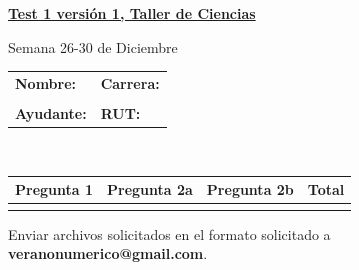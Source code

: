 \documentclass[11pt]{article}
\begin{document}
\hspace*{-1,5cm}

\vspace*{0.5cm} \centerline {\bf\underline{Test 1 versión 1, Taller de Ciencias }}
\centerline{\textrm{Semana 26-30 de Diciembre}}  \vspace{0.2cm}


\begin{center}
 \begin{tabular}{p{}p{}}
	\textbf{Nombre:}   &\textbf{Carrera:}\\ \\
	\textbf{Ayudante:} & \textbf{ RUT:}
 \end{tabular}
 \\
 \vspace{0.2cm}
 \begin{tabular}{||p{2cm}|p{2.1cm}|p{2.1cm}||p{2cm}||}
 \hline
 Pregunta 1 &  Pregunta 2a &    Pregunta 2b & Total\\
 \hline
 \vspace{1.5cm} & & &    \\
 \hline
 \end{tabular}
 \end{center}
 Enviar archivos solicitados en el formato solicitado a \textbf{veranonumerico@gmail.com}.
\end{document}
